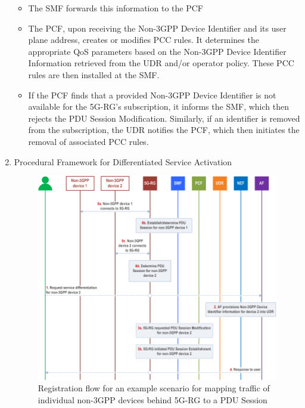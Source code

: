 \begin{enumerate}
{\begin{itemize}
            \item The \ac{SMF} forwards this information to the \ac{PCF}~\cite{23.503-p110}
            \item The \ac{PCF}, upon receiving the Non-\ac{3GPP} Device Identifier and its user plane address, creates or modifies \ac{PCC} rules. It determines the appropriate \ac{QoS} parameters based on the Non-\ac{3GPP} Device Identifier Information retrieved from the \ac{UDR} and/or operator policy. These \ac{PCC} rules are then installed at the \ac{SMF}.
            \item If the \ac{PCF} finds that a provided Non-\ac{3GPP} Device Identifier is not available for the \ac{5G-RG}'s subscription, it informs the \ac{SMF}, which then rejects the \ac{PDU} Session Modification. Similarly, if an identifier is removed from the subscription, the \ac{UDR} notifies the \ac{PCF}, which then initiates the removal of associated \ac{PCC} rules.
        \end{itemize}
    }
    \item {
        Procedural Framework for Differentiated Service Activation ~\cite{23.316-p29}~\cite{23.316-p95}

        \begin{figure}
            \centering
            \includegraphics[width=0.75\linewidth]{figs/Example scenario for mapping traffic of individual non-3GPP devices behind 5G-RG to a PDU Session Flow.png}
            \caption{Registration flow for an example scenario for mapping traffic of individual non-\ac{3GPP} devices behind \ac{5G-RG} to a \ac{PDU} Session}
            \label{fig:Registration flow for an example scenario for mapping traffic of individual non-3GPP devices behind 5G-RG to a PDU Session}
        \end{figure}
        
}
\end{enumerate}
